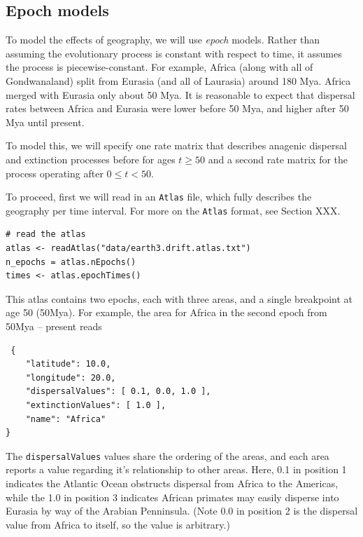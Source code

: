 \subsection{Epoch models}

To model the effects of geography, we will use {\it epoch} models.
Rather than assuming the evolutionary process is constant with respect to time, it assumes the process is piecewise-constant.
For example, Africa (along with all of Gondwanaland) split from Eurasia (and all of Laurasia) around 180 Mya.
Africa merged with Eurasia only about 50 Mya.
It is reasonable to expect that dispersal rates between Africa and Eurasia were lower before 50 Mya, and higher after 50 Mya until present.

To model this, we will specify one rate matrix that describes anagenic dispersal and extinction processes before for ages $t \geq 50$ and a second rate matrix for the process operating after $0 \leq t < 50$.

To proceed, first we will read in an {\tt Atlas} file, which fully describes the geography per time interval.
For more on the {\tt Atlas} format, see Section XXX.

\begin{snugshade}
\begin{lstlisting}
# read the atlas
atlas <- readAtlas("data/earth3.drift.atlas.txt")
n_epochs = atlas.nEpochs()
times <- atlas.epochTimes()
\end{lstlisting}
\end{snugshade}

This atlas contains two epochs, each with three areas, and a single breakpoint at age 50 (50Mya).
For example, the area for Africa in the second epoch from 50Mya -- present reads
\begin{snugshade}
\begin{lstlisting}
 {
    "latitude": 10.0, 
    "longitude": 20.0,
	"dispersalValues": [ 0.1, 0.0, 1.0 ],
	"extinctionValues": [ 1.0 ],
    "name": "Africa"
}
\end{lstlisting}
\end{snugshade}

The {\tt dispersalValues} values share the ordering of the areas, and each area reports a value regarding it's relationship to other areas.
Here, 0.1 in position 1 indicates the Atlantic Ocean obstructs dispersal from Africa to the Americas, while the 1.0 in position 3 indicates African primates may easily disperse into Eurasia by way of the Arabian Penninsula.
(Note 0.0 in position 2 is the dispersal value from Africa to itself, so the value is arbitrary.)

